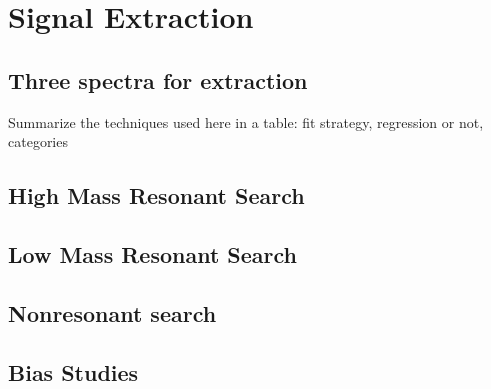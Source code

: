 \chapter{Signal Extraction\label{ch:signalextraction}}

\section{Three spectra for extraction\label{sec:threeSpectra}}
Summarize the techniques used here in a table: fit strategy, regression or not, categories


\section{High Mass Resonant Search\label{sec:highmassfit}}

\section{Low Mass Resonant Search\label{sec:lowmassfit}}

\section{Nonresonant search\label{sec:nonresfit}}

\section{Bias Studies\label{sec:biasstudies}}


